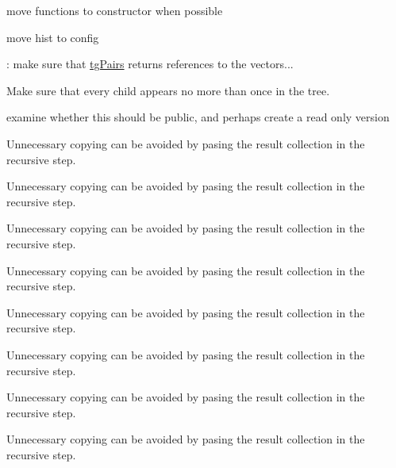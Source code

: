 \begin{DoxyRefList}
move functions to constructor when possible  
\item[\label{todo__todo000013}%
\hypertarget{todo__todo000013}{}%
Member \hyperlink{classtg_linear_string_acb8874a75256a2d8ebd73b4c26e6396e}{tg\-Linear\-String\-:\-:tg\-Linear\-String} (\hyperlink{class_muscle2_p}{Muscle2\-P} $\ast$muscle, const \hyperlink{classtg_tags}{tg\-Tags} \&tags, \hyperlink{structtg_base_string_1_1_config}{tg\-Base\-String\-::\-Config} \&config)]move hist to config  
\item[\label{todo__todo000079}%
\hypertarget{todo__todo000079}{}%
Member \hyperlink{classtg_linear_string_info_a22f715aabc4a2413e34bea9ef9f7465b}{tg\-Linear\-String\-Info\-:\-:tg\-Linear\-String\-Info} (const tg\-Linear\-String\-::\-Config \&config, const \hyperlink{classtg_pair}{tg\-Pair} \&pair)]\-: make sure that \hyperlink{classtg_pairs}{tg\-Pairs} returns references to the vectors...  
\item[\label{todo__todo000016}%
\hypertarget{todo__todo000016}{}%
Member \hyperlink{classtg_model_a292c17848b96caee32b2286e44c13f2f}{tg\-Model\-:\-:add\-Child} (\hyperlink{classtg_model}{tg\-Model} $\ast$p\-Child)]Make sure that every child appears no more than once in the tree.  
\item[\label{todo__todo000017}%
\hypertarget{todo__todo000017}{}%
Member \hyperlink{classtg_model_a2efa4321fa5c77b4ce23b01f6fd3a1c4}{tg\-Model\-:\-:get\-Descendants} () const ]examine whether this should be public, and perhaps create a read only version 

Unnecessary copying can be avoided by pasing the result collection in the recursive step. 

Unnecessary copying can be avoided by pasing the result collection in the recursive step. 

Unnecessary copying can be avoided by pasing the result collection in the recursive step. 

Unnecessary copying can be avoided by pasing the result collection in the recursive step. 

Unnecessary copying can be avoided by pasing the result collection in the recursive step. 

Unnecessary copying can be avoided by pasing the result collection in the recursive step. 

Unnecessary copying can be avoided by pasing the result collection in the recursive step. 

Unnecessary copying can be avoided by pasing the result collection in the recursive step. 


\end{DoxyRefList}
